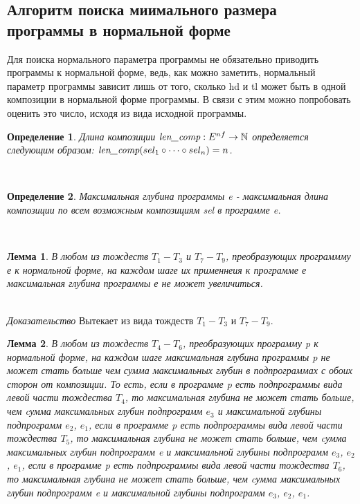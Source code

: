 \documentclass[12pt]{article}
\newtheorem{defn}{Определение}[section]
\newtheorem{lem}{Лемма}[section]
\begin{document}
\subsection{Алгоритм поиска миимального размера программы в нормальной форме}
Для поиска нормального параметра программы не обязательно приводить программы к нормальной форме, ведь, как можно заметить, нормальный параметр программы зависит лишь от того, сколько hd и tl может быть в одной композиции в нормальной форме программы. В связи с этим можно попробовать оценить это число, исходя из вида исходной программы.\\
\begin{defn} Длина композиции $\emph{len\_comp}: E^{nf} \rightarrow \mathbb{N}$ определяется следующим образом:
$\emph{len\_comp}(sel_{1} \circ \dots \circ sel_{n}) = n$.\end{defn}\\
\begin{defn} Максимальная глубина программы e - максимальная длина композиции по всем возможным композициям sel в программе e.\end{defn}\\
\begin{lem} В любом из тождеств $T_{1}-T_{3}$ и $T_{7}-T_{9}$, преобразующих программму е к нормальной форме, на каждом шаге их применнеия к программе е максимальная глубина программы е не может увеличиться.\end{lem}\\
\emph{Доказательство} Вытекает из вида тождеств $T_{1}-T_{3}$ и $T_{7}-T_{9}$.\\
\begin{lem} В любом из тождеств $T_{4}-T_{6}$, преобразующих программу p к нормальной форме, на каждом шаге максимальная глубина программы p не может стать больше чем сумма максимальных глубин в подпрограммах с обоих сторон от композиции. То есть, если в программе p есть подпрограммы вида левой части тождества $T_{4}$, то максимальная глубина не может стать больше, чем cумма максимальных глубин подпрограмм $e_{3}$ и максимальной глубины подпрограмм $e_{2}$, $e_{1}$, если в программе p есть подпрограммы вида левой части тождества $T_{5}$, то максимальная глубина не может стать больше, чем cумма максимальных глубин подпрограмм e и максимальной глубины подпрограмм $e_{3}$, $e_{2}$, $e_{1}$, если в программе p есть подпрограммы вида левой части тождества $T_{6}$, то максимальная глубина не может стать больше, чем cумма максимальных глубин подпрограмм e и максимальной глубины подпрограмм $e_{3}$, $e_{2}$, $e_{1}$.\end{lem}\\
\end{document}
